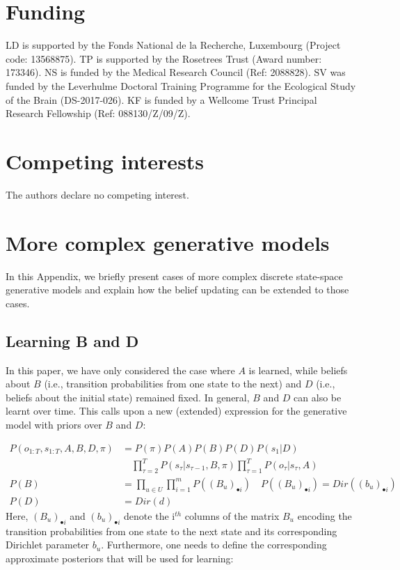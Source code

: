 \documentclass[review,12pt,authoryear]{elsarticle}
\begin{document}
\section*{Funding}

LD is supported by the Fonds National de la Recherche, Luxembourg (Project code: 13568875). TP is supported by the Rosetrees Trust (Award number: 173346). NS is funded by the Medical Research Council (Ref: 2088828). SV was funded by the Leverhulme Doctoral Training Programme for the Ecological Study of the Brain (DS-2017-026). KF is funded by a Wellcome Trust Principal Research Fellowship (Ref: 088130/Z/09/Z).

\section*{Competing interests}

The authors declare no competing interest.

\appendix

\section{More complex generative models}
\label{appendix: more complex models}

In this Appendix, we briefly present cases of more complex discrete state-space generative models and explain how the belief updating can be extended to those cases.

\subsection{Learning B and D}
\label{appendix:learning B D}

In this paper, we have only considered the case where $A$ is learned, while beliefs about $B$ (i.e., transition probabilities from one state to the next) and $D$ (i.e., beliefs about the initial state) remained fixed. In general, $B$ and $D$ can also be learnt over time. This calls upon a new (extended) expression for the generative model with priors over $B$ and $D$:

\begin{equation}
    \label{eq: gen mod with B and D}
    \begin{split}
           P(o_{1:T},s_{1:T},A,B,D,\pi) &=P(\pi) P(A)P(B)P(D)P(s_1|D) \\
           &\quad\prod_{\tau=2}^T P(s_\tau|s_{\tau-1},B, \pi) \prod_{\tau=1}^T  P(o_\tau|s_\tau,A)  \\
           P(B)&=\prod_{u\in U}\prod_{i=1}^m P((B_u)_{\bullet i})\quad P((B_u)_{\bullet i})=Dir((b_u)_{\bullet i})\\
           P(D)&=Dir(d)
    \end{split}
\end{equation}
Here, $(B_u)_{\bullet i}$ and $(b_u)_{\bullet i}$ denote the i$^{th}$ columns of the matrix $B_u$ encoding the transition probabilities from one state to the next state and its corresponding Dirichlet parameter $b_u$. Furthermore, one needs to define the corresponding approximate posteriors that will be used for learning:
\end{document}
